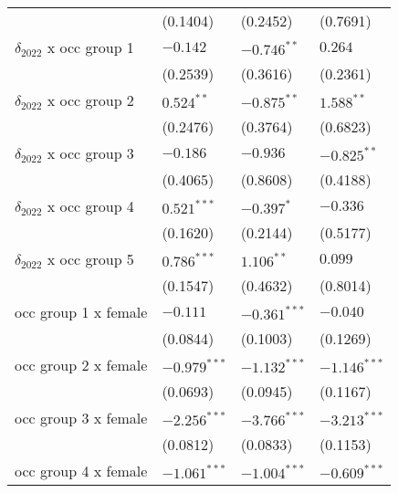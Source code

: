 \begin{tabular}{llll}
                                       &           (0.1404) &           (0.2452) &           (0.7691) \\
$\delta_{2022}$ x occ group 1          &           $-0.142$ &      $-0.746^{**}$ &            $0.264$ \\
                                       &           (0.2539) &           (0.3616) &           (0.2361) \\
$\delta_{2022}$ x occ group 2          &       $0.524^{**}$ &      $-0.875^{**}$ &       $1.588^{**}$ \\
                                       &           (0.2476) &           (0.3764) &           (0.6823) \\
$\delta_{2022}$ x occ group 3          &           $-0.186$ &           $-0.936$ &      $-0.825^{**}$ \\
                                       &           (0.4065) &           (0.8608) &           (0.4188) \\
$\delta_{2022}$ x occ group 4          &      $0.521^{***}$ &         $-0.397^*$ &           $-0.336$ \\
                                       &           (0.1620) &           (0.2144) &           (0.5177) \\
$\delta_{2022}$ x occ group 5          &      $0.786^{***}$ &       $1.106^{**}$ &            $0.099$ \\
                                       &           (0.1547) &           (0.4632) &           (0.8014) \\
occ group 1 x female                   &           $-0.111$ &     $-0.361^{***}$ &           $-0.040$ \\
                                       &           (0.0844) &           (0.1003) &           (0.1269) \\
occ group 2 x female                   &     $-0.979^{***}$ &     $-1.132^{***}$ &     $-1.146^{***}$ \\
                                       &           (0.0693) &           (0.0945) &           (0.1167) \\
occ group 3 x female                   &     $-2.256^{***}$ &     $-3.766^{***}$ &     $-3.213^{***}$ \\
                                       &           (0.0812) &           (0.0833) &           (0.1153) \\
occ group 4 x female                   &     $-1.061^{***}$ &     $-1.004^{***}$ &     $-0.609^{***}$ \\

\end{tabular}
